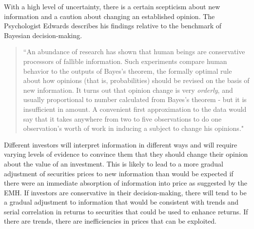\documentclass[12pt, a4paper, oneside]{article} %
\begin{document}
With a high level of uncertainty, there is a certain scepticism about new information and a caution about changing an established opinion. The Psychologist Edwards describes his findings relative to the benchmark of Bayesian decision-making.  
\begin{quotation}
``An abundance of research has shown that human beings are conservative processors of fallible information.  Such experiments compare human behavior to the outputs of Bayes's theorem, the formally optimal rule about how opinions (that is, probabilities) should be revised on the basis of new information.  It turns out that opinion change is very \emph{orderly}, and usually proportional to number calculated from Bayes's theorem  - but it is insufficient in amount.  A convenient first approximation to the data would say that it takes anywhere from two to five observations to do one observation's worth of work in inducing a subject to change his opinions."  
\end{quotation}
\citep[p. 359]{KahnemanUncertainty}  

Different investors will interpret information in different ways and will require varying levels of evidence to convince them that they should change their opinion about the value of an investment.  This is likely to lead to a more gradual adjustment of securities prices to new information than would be expected if there were an immediate absorption of information into price as suggested by the EMH.  If investors are conservative in their decision-making, there will tend to be a gradual adjustment to information that would be consistent with trends and serial correlation in returns to securities that could be used to enhance returns.  If there are trends, there are inefficiencies in prices that can be exploited. 
\end{document}
